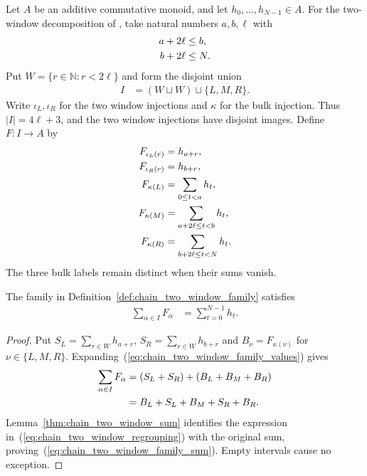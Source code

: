 \begin{definition}
    \label{def:chain_two_window_family}
    \leanok
    Let $A$ be an additive commutative monoid, and let
    $h_0,\ldots,h_{N-1}\in A$. For the two-window decomposition of
    \cite{Arad2016RigorousRG}, take natural numbers $a,b,\ell$ with
    \begin{align}
        a+2\ell & \le b,\notag \\
        b+2\ell & \le N.
        \label{eq:chain_two_window_admissibility}
    \end{align}
    Put $W=\{r\in\mathbb N:r<2\ell\}$ and form the disjoint union
    \begin{align}
        I & =(W\sqcup W)\sqcup\{L,M,R\}.
        \label{eq:chain_two_window_family_alphabet}
    \end{align}
    Write $\iota_L,\iota_R$ for the two window injections and
    $\kappa$ for the bulk injection. Thus $|I|=4\ell+3$, and the two
    window injections have disjoint images. Define $F:I\to A$ by
    \begin{align}
        F_{\iota_L(r)} & =h_{a+r},\notag                  \\
        F_{\iota_R(r)} & =h_{b+r},\notag                  \\
        F_{\kappa(L)}  & =\sum_{0\le t<a}h_t,\notag       \\
        F_{\kappa(M)}  & =\sum_{a+2\ell\le t<b}h_t,\notag \\
        F_{\kappa(R)}  & =\sum_{b+2\ell\le t<N}h_t.
        \label{eq:chain_two_window_family_values}
    \end{align}
    The three bulk labels remain distinct when their sums vanish.
\end{definition}

\begin{lemma}
    \label{thm:chain_two_window_family_sum}
    \leanok
    The family in Definition~\ref{def:chain_two_window_family} satisfies
    \begin{align}
        \sum_{\alpha\in I}F_\alpha & =\sum_{t=0}^{N-1}h_t.
        \label{eq:chain_two_window_family_sum}
    \end{align}
\end{lemma}
\begin{proof}\leanok
    Put $S_L=\sum_{r\in W}h_{a+r}$, $S_R=\sum_{r\in W}h_{b+r}$ and
    $B_\nu=F_{\kappa(\nu)}$ for $\nu\in\{L,M,R\}$.
    Expanding~(\ref{eq:chain_two_window_family_values}) gives
    \begin{align}
        \sum_{\alpha\in I}F_\alpha
         & =(S_L+S_R)+(B_L+B_M+B_R)\notag \\
         & =B_L+S_L+B_M+S_R+B_R.
        \label{eq:chain_two_window_regrouping}
    \end{align}
    Lemma~\ref{thm:chain_two_window_sum} identifies the expression
    in~(\ref{eq:chain_two_window_regrouping}) with the original sum,
    proving~(\ref{eq:chain_two_window_family_sum}). Empty intervals
    cause no exception.
\end{proof}

